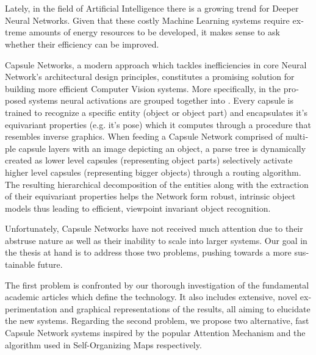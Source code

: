 \chapter*{}
\begin{otherlanguage}{english}
	
Lately, in the field of Artificial Intelligence there is a growing trend for Deeper Neural Networks. Given that these costly Machine Learning systems require extreme amounts of energy resources to be developed, it makes sense to ask whether their efficiency can be improved.\par

Capsule Networks, a modern approach which tackles inefficiencies in core Neural Network's architectural design principles, constitutes a promising solution for building more efficient Computer Vision systems. More specifically, in the proposed systems neural activations are grouped together into . Every capsule is trained to recognize a specific entity (object or object part) and encapsulates it's equivariant properties (e.g. it's pose) which it computes through a procedure that resembles inverse graphics. When feeding a Capsule Network comprised of multiple capsule layers with an image depicting an object, a parse tree is dynamically created as lower level capsules (representing object parts) selectively activate higher level capsules (representing bigger objects) through a routing algorithm. The resulting hierarchical decomposition of the entities along with the extraction of their equivariant properties helps the Network form robust, intrinsic object models thus leading to efficient, viewpoint invariant object recognition.\par

Unfortunately, Capsule Networks have not received much attention due to their abstruse nature as well as their inability to scale into larger systems. Our goal in the thesis at hand is to address those two problems, pushing towards a more sustainable future.\par

The first problem is confronted by our thorough investigation of the fundamental academic articles which define the technology. It also includes extensive, novel experimentation and graphical representations of the results, all aiming to elucidate the new systems. Regarding the second problem, we propose two alternative, fast Capsule Network systems inspired by the popular Attention Mechanism and the algorithm used in Self-Organizing Maps respectively.\par


\end{otherlanguage}

